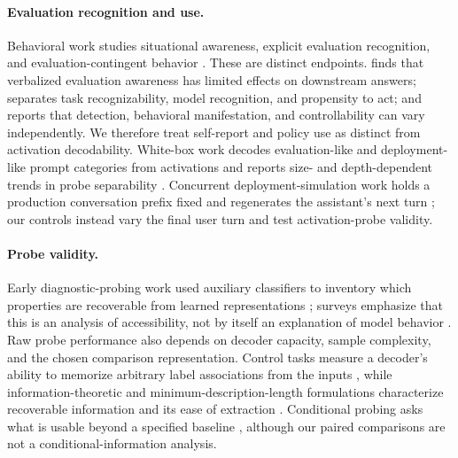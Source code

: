 \documentclass{article}
\begin{document}
\paragraph{Evaluation recognition and use.}
Behavioral work studies situational awareness, explicit evaluation recognition,
and evaluation-contingent behavior
\citep{laine2024sad,needham2025know,greenblatt2024alignment}. These are distinct
endpoints. \citet{knecht2026limited} finds that verbalized evaluation awareness
has limited effects on downstream answers; \citet{li2026decomposing} separates
task recognizability, model recognition, and propensity to act; and
\citet{nayan2026notone} reports that detection, behavioral manifestation, and
controllability can vary independently. We therefore treat self-report and
policy use as distinct from activation decodability. White-box work decodes
evaluation-like and deployment-like prompt categories from activations \citep{nguyen2025probing}
and reports size- and depth-dependent trends in probe separability
\citep{chaudhary2025scaling,manek2026depth}. Concurrent deployment-simulation
work holds a production conversation prefix fixed and regenerates the
assistant's next turn \citep{williams2026simulating}; our controls instead vary
the final user turn and test activation-probe validity.

\paragraph{Probe validity.}
Early diagnostic-probing work used auxiliary classifiers to inventory which
properties are recoverable from learned representations
\citep{adi2016finegrained,conneau2018cram,giulianelli2018hood}; surveys emphasize
that this is an analysis of accessibility, not by itself an explanation of model
behavior \citep{belinkov2019analysis,belinkov2022probing}. Raw probe performance
also depends on decoder capacity, sample complexity, and the chosen comparison
representation. Control tasks measure a decoder's ability to memorize arbitrary
label associations from the inputs \citep{hewitt2019controls}, while
information-theoretic and minimum-description-length formulations characterize
recoverable information and its ease of extraction
\citep{pimentel2020information,voita2020information}. Conditional probing asks
what is usable beyond a specified baseline \citep{hewitt2021conditional},
although our paired comparisons are not a conditional-information analysis.
\end{document}
